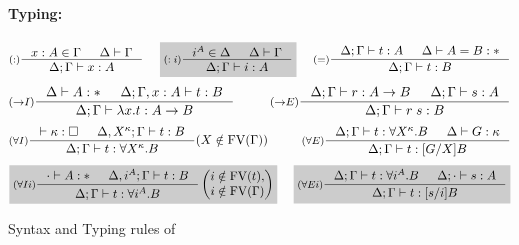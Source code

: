 \begin{figure}
\begin{framed}
\paragraph{Typing:} 
\[ \inference[($:$)]{x:A \in \Gamma & \Delta |- \Gamma} 
                    {\Delta;\Gamma |- x:A}
 ~~~~ \newFi{
   \inference[($:i$)]{i^A \in \Delta & \Delta |- \Gamma} 
                     {\Delta;\Gamma |- i:A} }
 ~~~~
   \inference[($=$)]{\Delta;\Gamma |- t : A & \Delta |- A = B : *}
                    {\Delta;\Gamma |- t : B}
\]
\[
   \inference[($->$$I$)]{\Delta |- A:* & \Delta;\Gamma,x:A |- t : B}
                        {\Delta;\Gamma |- \lambda x.t : A -> B}
 ~~~~ ~~~~
   \inference[($->$$E$)]{\Delta;\Gamma |- r : A -> B & \Delta;\Gamma |- s : A}
                        {\Delta;\Gamma |- r\;s : B}
\]
\[ \inference[($\forall I$)]{|- \kappa:\square & \Delta, X^\kappa;\Gamma |- t : B}
                            {\Delta;\Gamma |- t : \forall X^\kappa.B}
			    (X\notin\FV(\Gamma))
 ~~~~ ~~~~
   \inference[($\forall E$)]{ \Delta;\Gamma |- t : \forall X^\kappa.B
                            & \Delta |- G:\kappa }
                            {\Delta;\Gamma |- t : [G/X]B}
\]
\[ \newFi{
   \inference[($\forall I i$)]{\cdot |- A:* & \Delta, i^A;\Gamma |- t : B}
                              {\Delta;\Gamma |- t : \forall i^A.B}
   \left(\begin{matrix}
		i\notin\FV(t),\\
		i\notin\FV(\Gamma)\end{matrix}\right) }
 ~~~~ \newFi{
   \inference[($\forall E i$)]{ \Delta;\Gamma |- t : \forall i^A.B
                              & \Delta;\cdot |- s:A}
                              {\Delta;\Gamma |- t : [s/i]B} }
\]
\end{framed}
\caption{Syntax and Typing rules of \Fi}
\label{fig:Fi}
\end{figure}

